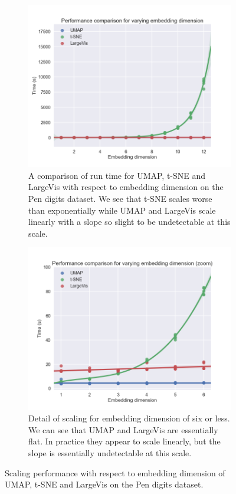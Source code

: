 \documentclass[12pt]{article}
\begin{document}
\begin{figure}[!hbtp]
    \centering
    \begin{subfigure}[t]{0.45\textwidth}
        \includegraphics[width=\textwidth]{embedding_dim_scaling1.png}
        \caption{A comparison of run time for UMAP, t-SNE and LargeVis with respect to embedding dimension on the Pen digits dataset.  We see that t-SNE scales worse than exponentially while UMAP and LargeVis scale linearly with a slope so slight to be undetectable at this scale.}
        \label{fig:large_scale_embedding_dim}
    \end{subfigure}
    \quad
    \begin{subfigure}[t]{0.45\textwidth}
        \includegraphics[width=\textwidth]{embedding_dim_scaling2.png}
        \caption{Detail of scaling for embedding dimension of six or less. We can see that UMAP and LargeVis are essentially flat. In practice they
        appear to scale linearly, but the slope is essentially undetectable at this scale.}
        \label{fig:small_scale_embedding_dim}
    \end{subfigure}
    \caption{Scaling performance with respect to embedding dimension of UMAP, t-SNE and LargeVis on the Pen digits dataset.}
    \label{fig:scale_embedding_dim_umap-tsne}
\end{figure}
\end{document}
